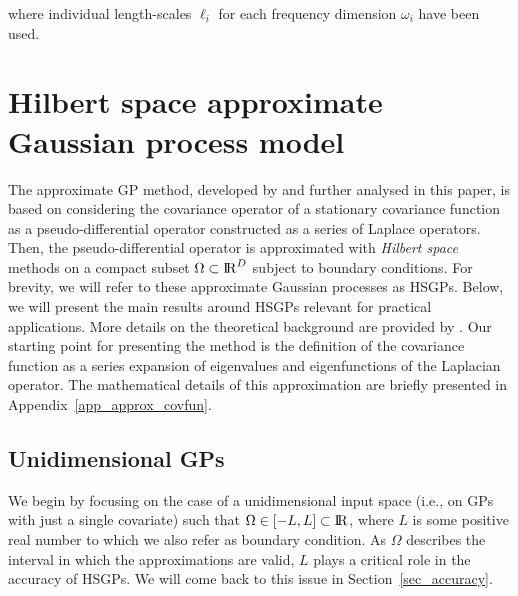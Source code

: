 %
where individual length-scales $\ell_i$ for each frequency dimension $\omega_i$ have been used.

\section{Hilbert space approximate Gaussian process model}\label{sec_method}

The approximate GP method, developed by \citet{solin2018hilbert} and further analysed in this paper, is based on considering the covariance operator of a stationary covariance function as a pseudo-differential operator constructed as a series of Laplace operators. Then, the pseudo-differential operator is approximated with \emph{Hilbert space} methods on a compact subset $\Omega \subset {\rm I\!R}^D$ subject to boundary conditions. For brevity, we will refer to these approximate Gaussian processes as HSGPs. Below, we will present the main results around HSGPs relevant for practical applications. More details on the theoretical background are provided by \citet{solin2018hilbert}. Our starting point for presenting the method is the definition of the covariance function as a series expansion of eigenvalues and eigenfunctions of the Laplacian operator. The mathematical details of this approximation are briefly presented in Appendix~\ref{app_approx_covfun}.

\subsection{Unidimensional GPs} \label{sec_method_uni}

We begin by focusing on the case of a unidimensional input space (i.e., on GPs with just a single covariate) such that $\Omega \in [-L,L] \subset {\rm I\!R}$, where $L$ is some positive real number to which we also refer as boundary condition. As $\Omega$ describes the interval in which the approximations are valid, $L$ plays a critical role in the accuracy of HSGPs. We will come back to this issue in Section~\ref{sec_accuracy}.

